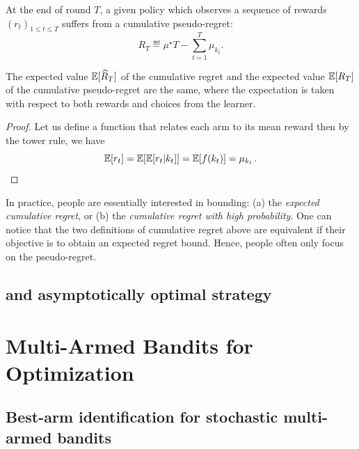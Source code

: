 \begin{definition}\label{def:mab.pseudo_regret}
\begin{leftbar}[defnbar]
	At the end of round $T$, a given policy which observes a sequence of rewards $(r_t)_{1 \leq t \leq T}$ suffers from a cumulative pseudo-regret:
	\[
		R_T \eqdef \mu^{\star}T - \sum_{t=1}^T \mu_{k_t}.
	\]
\end{leftbar}
\end{definition}

\begin{proposition}\label{prop:mab.pseudo_regret}
\begin{leftbar}[propositionbar]
	The expected value $\mathbb{E}[\widehat{R}_T]$ of the cumulative regret and the expected value $\mathbb{E}[R_T]$ of the cumulative pseudo-regret are the same, where the expectation is taken with respect to both rewards and choices from the learner.
\end{leftbar}
\end{proposition}

\begin{proof}
	Let us define a function that relates each arm to its mean reward  then by the tower rule, we have
    \[
	    \mathbb{E}[r_t] = \mathbb{E}[\mathbb{E}[r_t|k_t]] = \mathbb{E}[f(k_t)] = \mu_{k_t}\,.
    \]
\end{proof}

In practice, people are essentially interested in bounding: (a) the \emph{expected cumulative regret}, or (b) the \emph{cumulative regret with high probability}. One can notice that the two definitions of cumulative regret above are equivalent if their objective is to obtain an expected regret bound. Hence, people often only focus on the pseudo-regret. 


\subsection{\UCB{} and asymptotically optimal strategy}\label{sec:mab.model.ucb}

\section{Multi-Armed Bandits for Optimization}\label{sec:mab.optim}

\subsection{Best-arm identification for stochastic multi-armed bandits}

